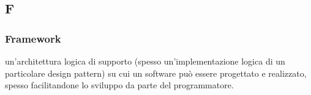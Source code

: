 \subsection*{\textbf{\hfill \Huge{F} \hfill}} 
\subsubsection*{Framework}
un’architettura logica di supporto (spesso un’implementazione logica di un particolare design pattern) su cui un software può essere progettato e realizzato, spesso facilitandone lo sviluppo da parte del programmatore.
